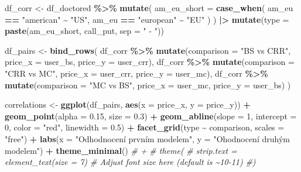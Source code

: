 \documentclass[
]{article}
\newenvironment{Shaded}{\begin{snugshade}}{\end{snugshade}}
\newcommand{\AttributeTok}[1]{\textcolor[rgb]{0.13,0.29,0.53}{#1}}
\newcommand{\CommentTok}[1]{\textcolor[rgb]{0.56,0.35,0.01}{\textit{#1}}}
\newcommand{\DecValTok}[1]{\textcolor[rgb]{0.00,0.00,0.81}{#1}}
\newcommand{\FloatTok}[1]{\textcolor[rgb]{0.00,0.00,0.81}{#1}}
\newcommand{\FunctionTok}[1]{\textcolor[rgb]{0.13,0.29,0.53}{\textbf{#1}}}
\newcommand{\NormalTok}[1]{#1}
\newcommand{\OtherTok}[1]{\textcolor[rgb]{0.56,0.35,0.01}{#1}}
\newcommand{\SpecialCharTok}[1]{\textcolor[rgb]{0.81,0.36,0.00}{\textbf{#1}}}
\newcommand{\StringTok}[1]{\textcolor[rgb]{0.31,0.60,0.02}{#1}}
\begin{document}
\begin{Shaded}
\begin{Highlighting}[]
\NormalTok{df\_corr }\OtherTok{\textless{}{-}}\NormalTok{ df\_doctored }\SpecialCharTok{\%\textgreater{}\%}
  \FunctionTok{mutate}\NormalTok{(}
    \AttributeTok{am\_eu\_short =} \FunctionTok{case\_when}\NormalTok{(}
\NormalTok{      am\_eu }\SpecialCharTok{==} \StringTok{"american"} \SpecialCharTok{\textasciitilde{}} \StringTok{"US"}\NormalTok{,}
\NormalTok{      am\_eu }\SpecialCharTok{==} \StringTok{"european"} \SpecialCharTok{\textasciitilde{}} \StringTok{"EU"}
\NormalTok{    )}
\NormalTok{  ) }\SpecialCharTok{|\textgreater{}}
  \FunctionTok{mutate}\NormalTok{(}\AttributeTok{type =} \FunctionTok{paste}\NormalTok{(am\_eu\_short, call\_put, }\AttributeTok{sep =} \StringTok{" {-} "}\NormalTok{))}

\NormalTok{df\_pairs }\OtherTok{\textless{}{-}} \FunctionTok{bind\_rows}\NormalTok{(}
\NormalTok{  df\_corr }\SpecialCharTok{\%\textgreater{}\%} \FunctionTok{mutate}\NormalTok{(}\AttributeTok{comparison =} \StringTok{"BS vs CRR"}\NormalTok{, }\AttributeTok{price\_x =}\NormalTok{ user\_bs,   }\AttributeTok{price\_y =}\NormalTok{ user\_crr),}
\NormalTok{  df\_corr }\SpecialCharTok{\%\textgreater{}\%} \FunctionTok{mutate}\NormalTok{(}\AttributeTok{comparison =} \StringTok{"CRR vs MC"}\NormalTok{, }\AttributeTok{price\_x =}\NormalTok{ user\_crr,  }\AttributeTok{price\_y =}\NormalTok{ user\_mc),}
\NormalTok{  df\_corr }\SpecialCharTok{\%\textgreater{}\%} \FunctionTok{mutate}\NormalTok{(}\AttributeTok{comparison =} \StringTok{"MC vs BS"}\NormalTok{,  }\AttributeTok{price\_x =}\NormalTok{ user\_mc,   }\AttributeTok{price\_y =}\NormalTok{ user\_bs)}
\NormalTok{)}

\NormalTok{correlations }\OtherTok{\textless{}{-}} \FunctionTok{ggplot}\NormalTok{(df\_pairs, }\FunctionTok{aes}\NormalTok{(}\AttributeTok{x =}\NormalTok{ price\_x, }\AttributeTok{y =}\NormalTok{ price\_y)) }\SpecialCharTok{+}
  \FunctionTok{geom\_point}\NormalTok{(}\AttributeTok{alpha =} \FloatTok{0.15}\NormalTok{, }\AttributeTok{size =} \FloatTok{0.3}\NormalTok{) }\SpecialCharTok{+}
  \FunctionTok{geom\_abline}\NormalTok{(}\AttributeTok{slope =} \DecValTok{1}\NormalTok{, }\AttributeTok{intercept =} \DecValTok{0}\NormalTok{, }\AttributeTok{color =} \StringTok{"red"}\NormalTok{, }\AttributeTok{linewidth =} \FloatTok{0.5}\NormalTok{) }\SpecialCharTok{+}
  \FunctionTok{facet\_grid}\NormalTok{(type }\SpecialCharTok{\textasciitilde{}}\NormalTok{ comparison, }\AttributeTok{scales =} \StringTok{"free"}\NormalTok{) }\SpecialCharTok{+}
  \FunctionTok{labs}\NormalTok{(}\AttributeTok{x =} \StringTok{"Odhodnocení prvním modelem"}\NormalTok{, }\AttributeTok{y =} \StringTok{"Ohodnocení druhým modelem"}\NormalTok{) }\SpecialCharTok{+}
  \FunctionTok{theme\_minimal}\NormalTok{() }\CommentTok{\# +}
  \CommentTok{\# theme(}
 \CommentTok{\#   strip.text = element\_text(size = 7) \# Adjust font size here (default is \textasciitilde{}10{-}11)}
  \CommentTok{\#)}


\end{Highlighting}
\end{Shaded}
\end{document}
